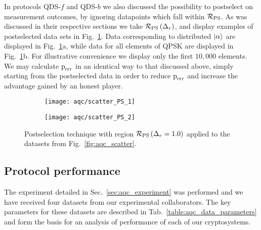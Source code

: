 In protocols QDS-$f$ and QDS-$b$ we also discussed the possibility to postselect on measurement outcomes, by ignoring datapoints which fall within $\mathcal{R}_{\text{PS}}$. As was discussed in their respective sections we take $\mathcal{R}_{\text{PS}}\left(\Delta_r\right)$, and display examples of postselected data sets in Fig.~\ref{fig:aqc_ps}. Data corresponding to distributed $\ket{\alpha}$ are displayed in Fig.~\ref{fig:aqc_ps}a, while data for all elements of QPSK are displayed in Fig.~\ref{fig:aqc_ps}b. For illustrative convenience we display only the first $10,000$ elements. We may calculate $\text{p}_{\text{err}}$ in an identical way to that discussed above, simply starting from the postselected data in order to reduce $\text{p}_{\text{err}}$ and increase the advantage gained by an honest player.

\begin{figure}[htp]
\captionsetup{width=0.8\linewidth}
\centering
	\begin{subfigure}{0.49\linewidth}
	\centering
	\texttt{[image: aqc/scatter\_PS\_1]}
	\caption{}
	\end{subfigure}
	\begin{subfigure}{0.49\linewidth}
	\centering
	\texttt{[image: aqc/scatter\_PS\_2]}
	\caption{}
	\end{subfigure}
\caption{\label{fig:aqc_ps} Postselection technique with region $\mathcal{R}_{\text{PS}}\left(\Delta_r=1.0\right)$ applied to the datasets from Fig.~\ref{fig:aqc_scatter}.}
\end{figure}


\FloatBarrier
\subsection{Protocol performance}\label{sec:aqc_performance}
The experiment detailed in Sec.~\ref{sec:aqc_experiment} was  performed and we have received four datasets from our experimental collaborators. The key parameters for these datasets are described in Tab.~\ref{table:aqc_data_parameters} and form the basis for an analysis of performance of each of our cryptosystems.

